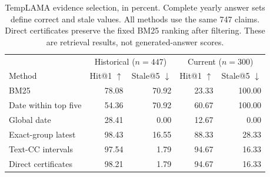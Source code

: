 \begin{table}[t]
\centering
\small
\begin{tabular}{lrrrr}
\toprule
& \multicolumn{2}{c}{Historical ($n=447$)} & \multicolumn{2}{c}{Current ($n=300$)} \\ 
Method & Hit@1 $\uparrow$ & Stale@5 $\downarrow$ & Hit@1 $\uparrow$ & Stale@5 $\downarrow$ \\
\midrule
BM25 & 78.08 & 70.92 & 23.33 & 100.00 \\
Date within top five & 54.36 & 70.92 & 60.67 & 100.00 \\
Global date & 28.41 & 0.00 & 12.67 & 0.00 \\
Exact-group latest & 98.43 & 16.55 & 88.33 & 28.33 \\
Text-CC intervals & 97.54 & 1.79 & 94.67 & 16.33 \\
Direct certificates & 98.21 & 1.79 & 94.67 & 16.33 \\
\bottomrule
\end{tabular}
\caption{TempLAMA evidence selection, in percent. Complete yearly answer sets define correct and stale values. All methods use the same 747 claims. Direct certificates preserve the fixed BM25 ranking after filtering. These are retrieval results, not generated-answer scores.}
\label{tab:retrieval}
\end{table}
